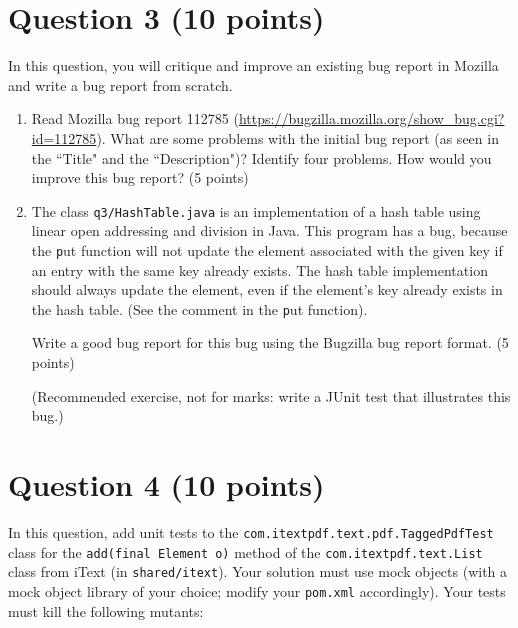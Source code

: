 \documentclass[10pt,hidelinks]{article}
\begin{document}
\section*{Question 3 (10 points)} 
In this question, you will critique and improve an existing bug report in Mozilla and write a bug report from scratch. 

\begin{enumerate}[label=(\alph*)]

\item Read Mozilla bug report 112785 (\url{https://bugzilla.mozilla.org/show_bug.cgi?id=112785}). What are some problems with the initial bug report (as seen in the ``Title" and the ``Description")? Identify four problems. How would you improve this bug report? (5 points)

\item
 The class {\tt q3/HashTable.java} is an implementation of a hash table using linear open addressing and division in Java.
This program has a bug, because the {\texttt put} function will not update the element associated with the given key if an entry with the same key already exists. The hash table implementation should always update the element, even if the element's key already exists in the hash table. (See the comment in the {\texttt put} function). 

Write a good bug report for this bug using the Bugzilla bug report format. (5 points)

(Recommended exercise, not for marks: write a JUnit test that illustrates this bug.)

 \end{enumerate}


\section*{Question 4 (10 points)} 

In this question, add unit tests to the {\tt com.itextpdf.text.pdf.TaggedPdfTest} class for the
{\tt add(final Element o)} method of the {\tt com.itextpdf.text.List} class from iText 
(in {\tt shared/itext}).
Your solution must use mock objects (with
a mock object library of your choice; modify your {\tt pom.xml} accordingly). 
Your tests must kill the following
mutants:
\end{document}
